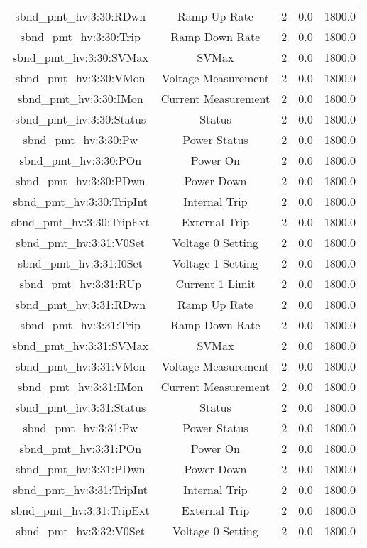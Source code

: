 \begin{table}[ptb]
\begin{tabular}{c | c c c c}
sbnd_pmt_hv:3:30:RDwn & Ramp Up Rate & 2 & 0.0 & 1800.0\\ 
sbnd_pmt_hv:3:30:Trip & Ramp Down Rate & 2 & 0.0 & 1800.0\\ 
sbnd_pmt_hv:3:30:SVMax & SVMax & 2 & 0.0 & 1800.0\\ 
sbnd_pmt_hv:3:30:VMon & Voltage Measurement & 2 & 0.0 & 1800.0\\ 
sbnd_pmt_hv:3:30:IMon & Current Measurement & 2 & 0.0 & 1800.0\\ 
sbnd_pmt_hv:3:30:Status & Status & 2 & 0.0 & 1800.0\\ 
sbnd_pmt_hv:3:30:Pw & Power Status & 2 & 0.0 & 1800.0\\ 
sbnd_pmt_hv:3:30:POn & Power On & 2 & 0.0 & 1800.0\\ 
sbnd_pmt_hv:3:30:PDwn & Power Down & 2 & 0.0 & 1800.0\\ 
sbnd_pmt_hv:3:30:TripInt & Internal Trip & 2 & 0.0 & 1800.0\\ 
sbnd_pmt_hv:3:30:TripExt & External Trip & 2 & 0.0 & 1800.0\\ 
sbnd_pmt_hv:3:31:V0Set & Voltage 0 Setting & 2 & 0.0 & 1800.0\\ 
sbnd_pmt_hv:3:31:I0Set & Voltage 1 Setting & 2 & 0.0 & 1800.0\\ 
sbnd_pmt_hv:3:31:RUp & Current 1 Limit & 2 & 0.0 & 1800.0\\ 
sbnd_pmt_hv:3:31:RDwn & Ramp Up Rate & 2 & 0.0 & 1800.0\\ 
sbnd_pmt_hv:3:31:Trip & Ramp Down Rate & 2 & 0.0 & 1800.0\\ 
sbnd_pmt_hv:3:31:SVMax & SVMax & 2 & 0.0 & 1800.0\\ 
sbnd_pmt_hv:3:31:VMon & Voltage Measurement & 2 & 0.0 & 1800.0\\ 
sbnd_pmt_hv:3:31:IMon & Current Measurement & 2 & 0.0 & 1800.0\\ 
sbnd_pmt_hv:3:31:Status & Status & 2 & 0.0 & 1800.0\\ 
sbnd_pmt_hv:3:31:Pw & Power Status & 2 & 0.0 & 1800.0\\ 
sbnd_pmt_hv:3:31:POn & Power On & 2 & 0.0 & 1800.0\\ 
sbnd_pmt_hv:3:31:PDwn & Power Down & 2 & 0.0 & 1800.0\\ 
sbnd_pmt_hv:3:31:TripInt & Internal Trip & 2 & 0.0 & 1800.0\\ 
sbnd_pmt_hv:3:31:TripExt & External Trip & 2 & 0.0 & 1800.0\\ 
sbnd_pmt_hv:3:32:V0Set & Voltage 0 Setting & 2 & 0.0 & 1800.0\\ 

\end{tabular}
\end{table}
